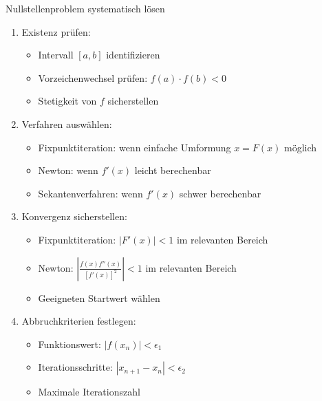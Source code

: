 \begin{KR}{Nullstellenproblem systematisch lösen}
\begin{enumerate}
    \item Existenz prüfen:
    \begin{itemize}
        \item Intervall $[a,b]$ identifizieren
        \item Vorzeichenwechsel prüfen: $f(a) \cdot f(b) < 0$ 
        \item Stetigkeit von $f$ sicherstellen
    \end{itemize}
    
    \item Verfahren auswählen:
    \begin{itemize}
        \item Fixpunktiteration: wenn einfache Umformung $x = F(x)$ möglich
        \item Newton: wenn $f'(x)$ leicht berechenbar
        \item Sekantenverfahren: wenn $f'(x)$ schwer berechenbar
    \end{itemize}
    
    \item Konvergenz sicherstellen:
    \begin{itemize}
        \item Fixpunktiteration: $|F'(x)| < 1$ im relevanten Bereich
        \item Newton: $|\frac{f(x)f''(x)}{[f'(x)]^2}| < 1$ im relevanten Bereich
        \item Geeigneten Startwert wählen
    \end{itemize}
    
    \item Abbruchkriterien festlegen:
    \begin{itemize}
        \item Funktionswert: $|f(x_n)| < \epsilon_1$
        \item Iterationsschritte: $|x_{n+1}-x_n| < \epsilon_2$
        \item Maximale Iterationszahl
    \end{itemize}
\end{enumerate}
\end{KR}

